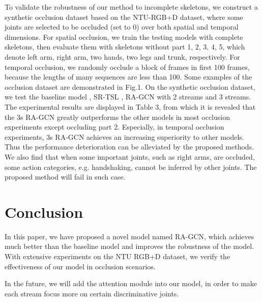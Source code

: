 \documentclass{article}
\begin{document}
To validate the robustness of our method to incomplete skeletons, we construct a synthetic occlusion dataset based on the NTU-RGB+D dataset, where some joints are selected to be occluded (set to 0) over both spatial and temporal dimensions. For spatial occlusion, we train the testing models with complete skeletons, then evaluate them with skeletons without part 1, 2, 3, 4, 5, which denote left arm, right arm, two hands, two legs and trunk, respectively. For temporal occlusion, we randomly occlude a block of frames in first 100 frames, because the lengths of many sequences are less than 100. Some examples of the occlusion dataset are demonstrated in Fig.1. On the synthetic occlusion dataset, we test the baseline model \cite{Yan2018}, SR-TSL \cite{Si2018}, RA-GCN with 2 streams and 3 streams. The experimental results are displayed in Table 3, from which it is revealed that the 3s RA-GCN greatly outperforms the other models in most occlusion experiments except occluding part 2. Especially, in temporal occlusion experiments, 3s RA-GCN achieves an increasing superiority to other models. Thus the performance deterioration can be alleviated by the proposed methods. We also find that when some important joints, such as right arms, are occluded, some action categories, e.g. handshaking, cannot be inferred by other joints. The proposed method will fail in such case.


\section{Conclusion}
\label{sec:conclusion}

In this paper, we have proposed a novel model named RA-GCN, which achieves much better than the baseline model and improves the robustness of the model. With extensive experiments on the NTU RGB+D dataset, we verify the effectiveness of our model in occlusion scenarios.

In the future, we will add the attention module into our model, in order to make each stream focus more on certain discriminative joints.




\end{document}
